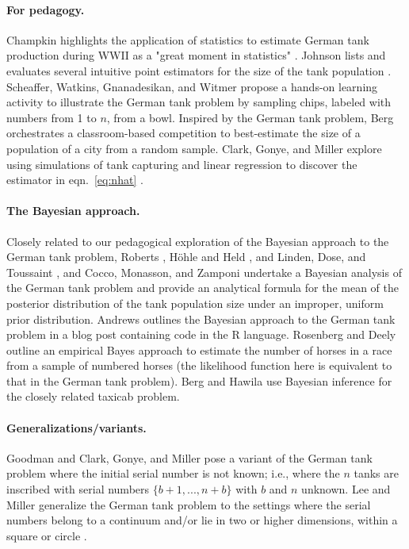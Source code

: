 \documentclass[11pt, oneside]{article}
\begin{document}
\paragraph{For pedagogy.} Champkin highlights the application of statistics to estimate German tank production during WWII as a "great moment in statistics" \cite{grajalez2013great}. 
Johnson lists and evaluates several intuitive point estimators for the size of the tank population \cite{johnson1994estimating}. 
Scheaffer, Watkins, Gnanadesikan, and Witmer \cite{scheaffer2013activity} propose a hands-on learning activity to illustrate the German tank problem by sampling chips, labeled with numbers from 1 to $n$, from a bowl. 
Inspired by the German tank problem, Berg \cite{berg2021bayesian} orchestrates a classroom-based competition to best-estimate the size of a population of a city from a random sample. Clark, Gonye, and Miller explore using simulations of tank capturing and linear regression to discover the estimator in eqn.~\ref{eq:nhat} \cite{clark2021lessons}. 


\paragraph{The Bayesian approach.}
Closely related to our pedagogical exploration of the Bayesian approach to the German tank problem, Roberts \cite{roberts1967informative}, H{\"o}hle and Held \cite{hohle2006bayesian}, and Linden, Dose, and Toussaint \cite{von2014bayesian}, and Cocco, Monasson, and Zamponi \cite{cocco2022statistical} undertake a Bayesian analysis of the German tank problem and provide an analytical formula for the mean of the posterior distribution of the tank population size under an improper, uniform prior distribution. Andrews \cite{blogpost} outlines the Bayesian approach to the German tank problem in a blog post containing code in the R language. 
Rosenberg and Deely \cite{rosenberg1976horse} outline an empirical Bayes approach to estimate the number of horses in a race from a sample of numbered horses (the likelihood function here is equivalent to that in the German tank problem). 
Berg and Hawila \cite{berg2021bayesian2} use Bayesian inference for the closely related taxicab problem. 

\paragraph{Generalizations/variants.}
Goodman \cite{goodman1952serial,goodman1954some} and Clark, Gonye, and Miller \cite{clark2021lessons} pose a variant of the German tank problem where the initial serial number is not known; i.e., where the $n$ tanks are inscribed with serial numbers $\{b+1, ..., n+b\}$ with $b$ and $n$ unknown. 
Lee and Miller generalize the German tank problem to the settings where the serial numbers belong to a continuum and/or lie in two or higher dimensions, within a square or circle \cite{lee2022generalizing}. 
\end{document}
